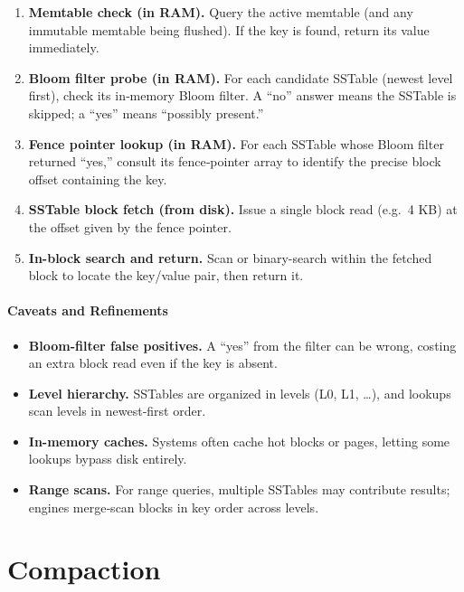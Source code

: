 \documentclass[sigconf]{acmart}
\begin{document}
      \begin{enumerate}
        \item \textbf{Memtable check (in RAM).}
          Query the active memtable (and any immutable memtable being flushed).
          If the key is found, return its value immediately.
        \item \textbf{Bloom filter probe (in RAM).}
          For each candidate SSTable (newest level first), check its in‐memory Bloom filter.
          A “no” answer means the SSTable is skipped; a “yes” means “possibly present.”
        \item \textbf{Fence pointer lookup (in RAM).}
          For each SSTable whose Bloom filter returned “yes,” consult its fence‐pointer array
          to identify the precise block offset containing the key.
        \item \textbf{SSTable block fetch (from disk).}
          Issue a single block read (e.g.\ 4 KB) at the offset given by the fence pointer.
        \item \textbf{In-block search and return.}
          Scan or binary-search within the fetched block to locate the key/value pair, then return it.
      \end{enumerate}

      \paragraph{Caveats and Refinements}
      \begin{itemize}
        \item \textbf{Bloom-filter false positives.}
          A “yes” from the filter can be wrong, costing an extra block read even if the key is absent.
        \item \textbf{Level hierarchy.}
          SSTables are organized in levels (L0, L1, …), and lookups scan levels in newest‐first order.
        \item \textbf{In-memory caches.}
          Systems often cache hot blocks or pages, letting some lookups bypass disk entirely.
        \item \textbf{Range scans.}
          For range queries, multiple SSTables may contribute results; engines merge‐scan blocks in key order across levels.
      \end{itemize}

    \section{Compaction}
      \label{sec:compaction}
\end{document}

